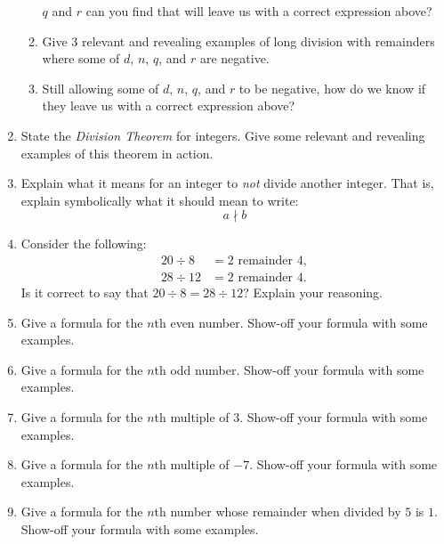 \begin{problems}
\begin{enumerate}
\begin{enumerate}
  $q$ and $r$ can you find that will leave us with a correct
  expression above?
\item Give $3$ relevant and revealing examples of long division with
  remainders where some of $d$, $n$, $q$, and $r$ are negative.
\item Still allowing some of $d$, $n$, $q$, and $r$ to be negative,
  how do we know if they leave us with a correct expression above?
\end{enumerate}
\item State the \textit{Division Theorem} for integers. Give some
  relevant and revealing examples of this theorem in action.
\item Explain what it means for an integer to \textit{not} divide
  another integer. That is, explain symbolically what it should mean
  to write:
\[
a \nmid b
\]
\item Consider the following:
\begin{align*}
20 \div 8 &= 2 \text{ remainder }4, \\
28 \div 12 &= 2 \text{ remainder }4.
\end{align*}
Is it correct to say that $20 \div 8 = 28 \div 12$? Explain your reasoning.
\item Give a formula for the $n$th even number. Show-off your formula
  with some examples.
\item Give a formula for the $n$th odd number. Show-off your formula
  with some examples.
\item Give a formula for the $n$th multiple of $3$. Show-off your
  formula with some examples.
\item Give a formula for the $n$th multiple of $-7$. Show-off your
  formula with some examples.
\item Give a formula for the $n$th number whose remainder when divided
  by $5$ is $1$. Show-off your formula
  with some examples.


\end{enumerate}
\end{problems}
